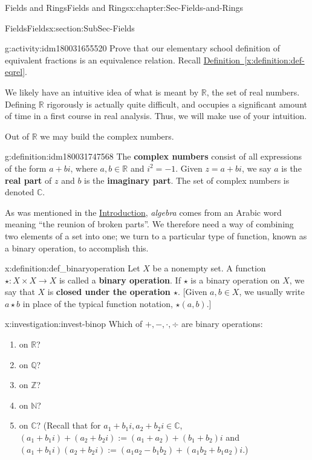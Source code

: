 \documentclass[oneside,10pt,]{book}
\newcommand{\xreffont}{\relax}
\newcommand{\terminology}[1]{\textbf{#1}}
\numberwithin{equation}{section}
\def\C{{\mathbb C}}
\def\Z{{\mathbb Z}}
\def\Q{{\mathbb Q}}
\def\N{{\mathbb N}}
\def\R{{\mathbb R}}
\begin{document}
\begin{chapterptx}{Fields and Rings}{}{Fields and Rings}{}{}{x:chapter:Sec-Fields-and-Rings}
\begin{sectionptx}{Fields}{}{Fields}{}{}{x:section:SubSec-Fields}
\begin{activity}{}{g:activity:idm180031655520}%
Prove that our elementary school definition of equivalent fractions is an equivalence relation. Recall \hyperref[x:definition:def-eqrel]{Definition~{\xreffont\ref{x:definition:def-eqrel}}}.%
\end{activity}
We likely have an intuitive idea of what is meant by \(\R\), the set of real numbers. Defining \(\R\) rigorously is actually quite difficult, and occupies a significant amount of time in a first course in real analysis. Thus, we will make use of your intuition. %
\par
Out of \(\R\) we may build the complex numbers.%
\begin{definition}{}{g:definition:idm180031747568}%
The \terminology{complex numbers} consist of all expressions of the form \(a+bi\), where \(a,b\in \R\) and \(i^2 = -1\). Given \(z = a+bi\), we say \(a\) is the \terminology{real part} of \(z\) and \(b\) is the \terminology{imaginary part}. The set of complex numbers is denoted \(\C\).%
\end{definition}
As was mentioned in the \hyperref[x:preface:Sec-Introduction]{Introduction}, \emph{algebra} comes from an Arabic word meaning ``the reunion of broken parts''. We therefore need a way of combining two elements of a set into one; we turn to a particular type of function, known as a binary operation, to accomplish this.%
\begin{definition}{}{x:definition:def_binaryoperation}%
%
 Let \(X\) be a nonempty set. A function \(\star : X \times X \to X\) is called a \terminology{binary operation}. If \(\star\) is a binary operation on \(X\), we say that \(X\) is \terminology{closed under the operation \(\star\)}. [Given \(a,b\in X\), we usually write \(a\star b\) in place of the typical function notation, \(\star(a,b)\).]%
\end{definition}
\begin{investigation}{}{x:investigation:invest-binop}%
Which of \(+, -, \cdot, \div\) are binary operations:%
\begin{enumerate}
\item{}on \(\R\)?%
\item{}on \(\Q\)?%
\item{}on \(\Z\)?%
\item{}on \(\N\)?%
\item{}on \(\C\)? (Recall that for \(a_1 + b_1 i, a_2 + b_2 i \in \C\), \((a_1 + b_1 i) + (a_2 + b_2 i) := (a_1 + a_2) + (b_1 + b_2)i\) and  \((a_1 + b_1 i)(a_2 + b_2 i) := (a_1 a_2 - b_1 b_2) + (a_1 b_2 + b_1 a_2) i\).)%

\end{enumerate}
\end{investigation}
\end{sectionptx}
\end{chapterptx}
\end{document}
